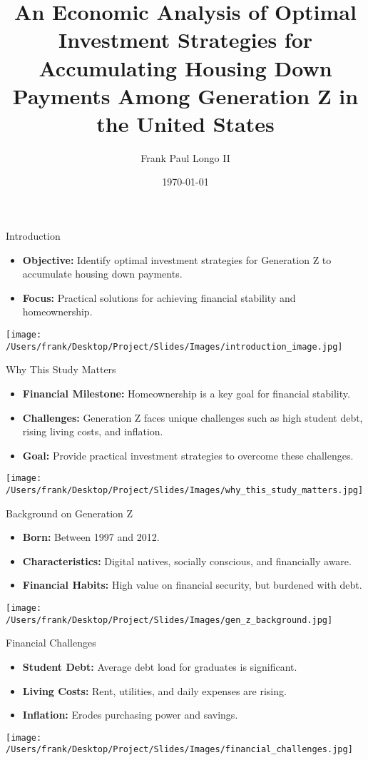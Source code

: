 \documentclass{beamer}
\title{An Economic Analysis of Optimal Investment Strategies for Accumulating Housing Down Payments Among Generation Z in the United States}
\author{Frank Paul Longo II}
\date{\today}
\begin{document}
\frame{\titlepage}

\begin{frame}{Introduction}
    \begin{itemize}
        \item \textbf{Objective:} Identify optimal investment strategies for Generation Z to accumulate housing down payments.
        \item \textbf{Focus:} Practical solutions for achieving financial stability and homeownership.
    \end{itemize}
    \centering
    \texttt{[image: /Users/frank/Desktop/Project/Slides/Images/introduction\_image.jpg]}
\end{frame}

\begin{frame}{Why This Study Matters}
    \begin{itemize}
        \item \textbf{Financial Milestone:} Homeownership is a key goal for financial stability.
        \item \textbf{Challenges:} Generation Z faces unique challenges such as high student debt, rising living costs, and inflation.
        \item \textbf{Goal:} Provide practical investment strategies to overcome these challenges.
    \end{itemize}
    \centering
    \texttt{[image: /Users/frank/Desktop/Project/Slides/Images/why\_this\_study\_matters.jpg]}
\end{frame}

\begin{frame}{Background on Generation Z}
    \begin{itemize}
        \item \textbf{Born:} Between 1997 and 2012.
        \item \textbf{Characteristics:} Digital natives, socially conscious, and financially aware.
        \item \textbf{Financial Habits:} High value on financial security, but burdened with debt.
    \end{itemize}
    \centering
    \texttt{[image: /Users/frank/Desktop/Project/Slides/Images/gen\_z\_background.jpg]}
\end{frame}

\begin{frame}{Financial Challenges}
    \begin{itemize}
        \item \textbf{Student Debt:} Average debt load for graduates is significant.
        \item \textbf{Living Costs:} Rent, utilities, and daily expenses are rising.
        \item \textbf{Inflation:} Erodes purchasing power and savings.
    \end{itemize}
    \centering
    \texttt{[image: /Users/frank/Desktop/Project/Slides/Images/financial\_challenges.jpg]}
\end{frame}
\end{document}
